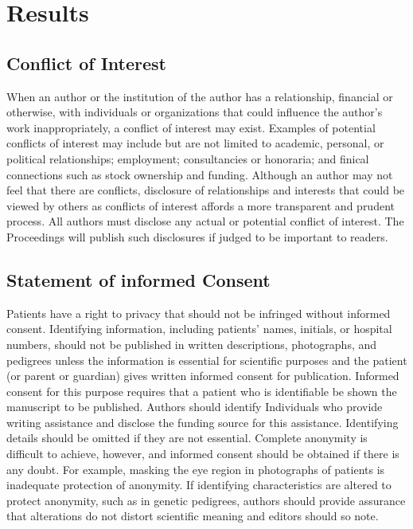 \section{Results}

\subsection{Conflict of Interest}
When an author or the institution of the author has a relationship, financial or otherwise, with individuals or organizations that could influence the author’s work inappropriately, a conflict of interest may exist. Examples of potential conflicts of interest may include but are not limited to academic, personal, or political relationships; employment; consultancies or honoraria; and finical connections such as stock ownership and funding. Although an author may not feel that there are conflicts, disclosure of relationships and interests that could be viewed by others as conflicts of interest affords a more transparent and prudent process. All authors must disclose any actual or potential conflict of interest. The Proceedings will publish such disclosures if judged to be important to readers.

\subsection{Statement of informed Consent}
Patients have a right to privacy that should not be infringed without informed consent. Identifying information, including patients' names, initials, or hospital numbers, should not be published in written descriptions, photographs, and pedigrees unless the information is essential for scientific purposes and the patient (or parent or guardian) gives written informed consent for publication. Informed consent for this purpose requires that a patient who is identifiable be shown the manuscript to be published. Authors should identify Individuals who provide writing assistance and disclose the funding source for this assistance. 
Identifying details should be omitted if they are not essential. Complete anonymity is difficult to achieve, however, and informed consent should be obtained if there is any doubt. For example, masking the eye region in photographs of patients is inadequate protection of anonymity. If identifying characteristics are altered to protect anonymity, such as in genetic pedigrees, authors should provide assurance that alterations do not distort scientific meaning and editors should so note.

